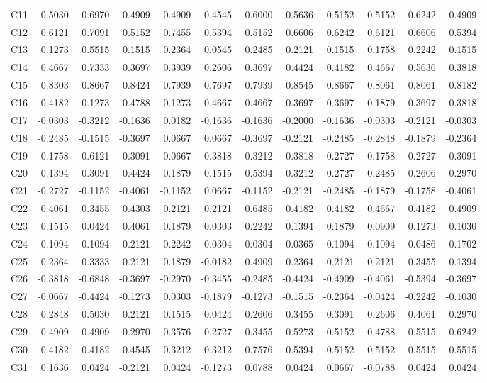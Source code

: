 {\begin{longtable}{@{}l*{11}{r}@{}}
C11 & 0.5030 & 0.6970 & 0.4909 & 0.4909 & 0.4545 & 0.6000 & 0.5636 & 0.5152 & 0.5152 & 0.6242 & 0.4909 \\
C12 & 0.6121 & 0.7091 & 0.5152 & 0.7455 & 0.5394 & 0.5152 & 0.6606 & 0.6242 & 0.6121 & 0.6606 & 0.5394 \\
C13 & 0.1273 & 0.5515 & 0.1515 & 0.2364 & 0.0545 & 0.2485 & 0.2121 & 0.1515 & 0.1758 & 0.2242 & 0.1515 \\
C14 & 0.4667 & 0.7333 & 0.3697 & 0.3939 & 0.2606 & 0.3697 & 0.4424 & 0.4182 & 0.4667 & 0.5636 & 0.3818 \\
C15 & 0.8303 & 0.8667 & 0.8424 & 0.7939 & 0.7697 & 0.7939 & 0.8545 & 0.8667 & 0.8061 & 0.8061 & 0.8182 \\
C16 & -0.4182 & -0.1273 & -0.4788 & -0.1273 & -0.4667 & -0.4667 & -0.3697 & -0.3697 & -0.1879 & -0.3697 & -0.3818 \\
C17 & -0.0303 & -0.3212 & -0.1636 & 0.0182 & -0.1636 & -0.1636 & -0.2000 & -0.1636 & -0.0303 & -0.2121 & -0.0303 \\
C18 & -0.2485 & -0.1515 & -0.3697 & 0.0667 & 0.0667 & -0.3697 & -0.2121 & -0.2485 & -0.2848 & -0.1879 & -0.2364 \\
C19 & 0.1758 & 0.6121 & 0.3091 & 0.0667 & 0.3818 & 0.3212 & 0.3818 & 0.2727 & 0.1758 & 0.2727 & 0.3091 \\
C20 & 0.1394 & 0.3091 & 0.4424 & 0.1879 & 0.1515 & 0.5394 & 0.3212 & 0.2727 & 0.2485 & 0.2606 & 0.2970 \\
C21 & -0.2727 & -0.1152 & -0.4061 & -0.1152 & 0.0667 & -0.1152 & -0.2121 & -0.2485 & -0.1879 & -0.1758 & -0.4061 \\
C22 & 0.4061 & 0.3455 & 0.4303 & 0.2121 & 0.2121 & 0.6485 & 0.4182 & 0.4182 & 0.4667 & 0.4182 & 0.4909 \\
C23 & 0.1515 & 0.0424 & 0.4061 & 0.1879 & 0.0303 & 0.2242 & 0.1394 & 0.1879 & 0.0909 & 0.1273 & 0.1030 \\
C24 & -0.1094 & 0.1094 & -0.2121 & 0.2242 & -0.0304 & -0.0304 & -0.0365 & -0.1094 & -0.1094 & -0.0486 & -0.1702 \\
C25 & 0.2364 & 0.3333 & 0.2121 & 0.1879 & -0.0182 & 0.4909 & 0.2364 & 0.2121 & 0.2121 & 0.3455 & 0.1394 \\
C26 & -0.3818 & -0.6848 & -0.3697 & -0.2970 & -0.3455 & -0.2485 & -0.4424 & -0.4909 & -0.4061 & -0.5394 & -0.3697 \\
C27 & -0.0667 & -0.4424 & -0.1273 & 0.0303 & -0.1879 & -0.1273 & -0.1515 & -0.2364 & -0.0424 & -0.2242 & -0.1030 \\
C28 & 0.2848 & 0.5030 & 0.2121 & 0.1515 & 0.0424 & 0.2606 & 0.3455 & 0.3091 & 0.2606 & 0.4061 & 0.2970 \\
C29 & 0.4909 & 0.4909 & 0.2970 & 0.3576 & 0.2727 & 0.3455 & 0.5273 & 0.5152 & 0.4788 & 0.5515 & 0.6242 \\
C30 & 0.4182 & 0.4182 & 0.4545 & 0.3212 & 0.3212 & 0.7576 & 0.5394 & 0.5152 & 0.5152 & 0.5515 & 0.5515 \\
C31 & 0.1636 & 0.0424 & -0.2121 & 0.0424 & -0.1273 & 0.0788 & 0.0424 & 0.0667 & -0.0788 & 0.0424 & 0.0424 \\
\end{longtable}
}

